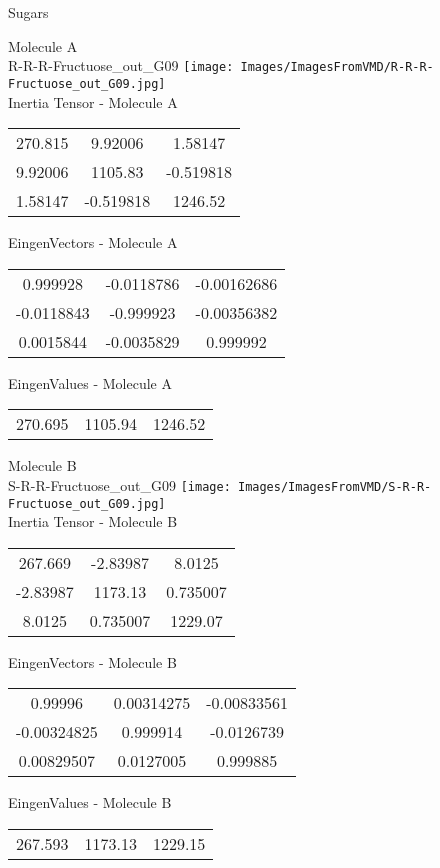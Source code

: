\vtab[-2cm]
\begin{center}
{\large Sugars}
\end{center}
\begin{multicols}{2}
\begin{center}
Molecule A \\ 
R-R-R-Fructuose\_out\_G09
\texttt{[image: Images/ImagesFromVMD/R-R-R-Fructuose\_out\_G09.jpg]}
\\
Inertia Tensor - Molecule A \\
\vtab
\begin{tabular}{|c c c|}
270.815	 & 	9.92006	 & 	1.58147	 \\
9.92006	 & 	1105.83	 & 	-0.519818	 \\
1.58147	 & 	-0.519818	 & 	1246.52
\end{tabular}

\vtab
 EingenVectors - Molecule A     \\
\vtab
\begin{tabular}{|c c c|}
0.999928	 & 	-0.0118786	 & 	-0.00162686	 \\
-0.0118843	 & 	-0.999923	 & 	-0.00356382	 \\
0.0015844	 & 	-0.0035829	 & 	0.999992
\end{tabular}

\vtab
 EingenValues - Molecule A     \\
\vtab
\begin{tabular}{|c c c|}
270.695	 & 	1105.94	 & 	1246.52
\end{tabular}
\columnbreak

Molecule B \\ 
S-R-R-Fructuose\_out\_G09
\texttt{[image: Images/ImagesFromVMD/S-R-R-Fructuose\_out\_G09.jpg]}
\\
Inertia Tensor - Molecule B \\
\vtab
\begin{tabular}{|c c c|}
267.669	 & 	-2.83987	 & 	8.0125	 \\
-2.83987	 & 	1173.13	 & 	0.735007	 \\
8.0125	 & 	0.735007	 & 	1229.07
\end{tabular}

\vtab
 EingenVectors - Molecule B     \\
\vtab
\begin{tabular}{|c c c|}
0.99996	 & 	0.00314275	 & 	-0.00833561	 \\
-0.00324825	 & 	0.999914	 & 	-0.0126739	 \\
0.00829507	 & 	0.0127005	 & 	0.999885
\end{tabular}

\vtab
 EingenValues - Molecule B     \\
\vtab
\begin{tabular}{|c c c|}
267.593	 & 	1173.13	 & 	1229.15
\end{tabular}

\end{center}
\end{multicols}
